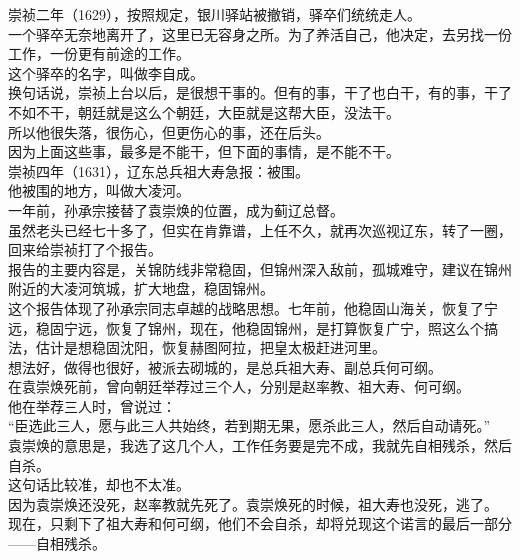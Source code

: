 \begin{multicols}{\theparacolNo}
崇祯二年（1629），按照规定，银川驿站被撤销，驿卒们统统走人。\\

一个驿卒无奈地离开了，这里已无容身之所。为了养活自己，他决定，去另找一份工作，一份更有前途的工作。\\

这个驿卒的名字，叫做李自成。\\

换句话说，崇祯上台以后，是很想干事的。但有的事，干了也白干，有的事，干了不如不干，朝廷就是这么个朝廷，大臣就是这帮大臣，没法干。\\

所以他很失落，很伤心，但更伤心的事，还在后头。\\

因为上面这些事，最多是不能干，但下面的事情，是不能不干。\\

崇祯四年（1631），辽东总兵祖大寿急报：被围。\\

他被围的地方，叫做大凌河。\\

一年前，孙承宗接替了袁崇焕的位置，成为蓟辽总督。\\

虽然老头已经七十多了，但实在肯靠谱，上任不久，就再次巡视辽东，转了一圈，回来给崇祯打了个报告。\\

报告的主要内容是，关锦防线非常稳固，但锦州深入敌前，孤城难守，建议在锦州附近的大凌河筑城，扩大地盘，稳固锦州。\\

这个报告体现了孙承宗同志卓越的战略思想。七年前，他稳固山海关，恢复了宁远，稳固宁远，恢复了锦州，现在，他稳固锦州，是打算恢复广宁，照这么个搞法，估计是想稳固沈阳，恢复赫图阿拉，把皇太极赶进河里。\\

想法好，做得也很好，被派去砌城的，是总兵祖大寿、副总兵何可纲。\\

在袁崇焕死前，曾向朝廷举荐过三个人，分别是赵率教、祖大寿、何可纲。\\

他在举荐三人时，曾说过：\\

“臣选此三人，愿与此三人共始终，若到期无果，愿杀此三人，然后自动请死。”\\

袁崇焕的意思是，我选了这几个人，工作任务要是完不成，我就先自相残杀，然后自杀。\\

这句话比较准，却也不太准。\\

因为袁崇焕还没死，赵率教就先死了。袁崇焕死的时候，祖大寿也没死，逃了。\\

现在，只剩下了祖大寿和何可纲，他们不会自杀，却将兑现这个诺言的最后一部分——自相残杀。\\
\ifnum{}
	\end{multicols}
\fi
\newpage
